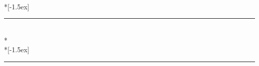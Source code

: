 
\theoremstyle{plain}%
\theoremstyle{definition}
\theoremstyle{remark}
    \newtheorem*{rem}{Remark}
    \newtheorem*{note}{Note}
    \newtheorem*{case}{Case}

{\topsep}{\topsep}%
{}{}%
{\bfseries}{}
{\newline}
{%
    \\*[-1.5ex]%
}%
\theoremstyle{mymathplain}
    \newtheorem*{thm}{Theorem}
    \newtheorem*{lem}{Lemma}
    \newtheorem*{prop}{Proposition}
    \newtheorem*{cor}{Corollary}

{\topsep}{\topsep}%
{}{}%
{\bfseries}{}
{\newline}
{%
    \rule{\textwidth}{0.4pt}\\*%
    \\*[-1.5ex]%
    \rule{\textwidth}{0.4pt}
}%
\theoremstyle{mymathdefinition}
    \newtheorem*{defn}{Definition}
    \newtheorem*{conj}{Conjecture}
    \newtheorem*{exmp}{Example}


